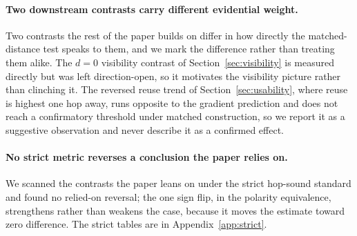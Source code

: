 \paragraph{Two downstream contrasts carry different evidential weight.} Two
contrasts the rest of the paper builds on differ in how directly the
matched-distance test speaks to them, and we mark the difference rather than
treating them alike. The $d{=}0$ visibility contrast of
Section~\ref{sec:visibility} is measured directly but was left
direction-open, so it motivates the visibility picture rather than clinching
it.
The reversed reuse trend of Section~\ref{sec:usability}, where reuse is
highest one hop away, runs opposite to the gradient prediction and does not
reach a confirmatory threshold under matched construction, so we report it as
a suggestive observation and never describe it as a confirmed effect.

\paragraph{No strict metric reverses a conclusion the paper relies on.} We
scanned the contrasts the paper leans on under the strict hop-sound
standard and found no relied-on reversal; the one sign flip, in the
polarity equivalence, strengthens rather than weakens the case, because it
moves the estimate toward zero difference.
The strict tables are in Appendix~\ref{app:strict}.
